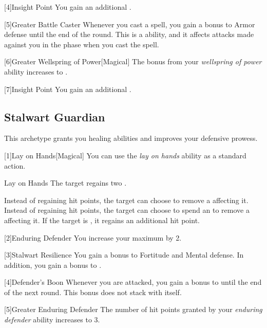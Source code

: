         [4]{Insight Point} You gain an additional .

        [5]{Greater Battle Caster} Whenever you cast a spell, you gain a  bonus to Armor defense until the end of the round.
        This is a  ability, and it affects attacks made against you in the phase when you cast the spell.

        [6]{Greater Wellspring of Power}[Magical]
        The bonus from your \textit{wellspring of power} ability increases to .

        [7]{Insight Point} You gain an additional .

    \subsection{Stalwart Guardian}
        This archetype grants you healing abilities and improves your defensive prowess.

        [1]{Lay on Hands}[Magical] You can use the \textit{lay on hands} ability as a standard action.
        \begin{freeability}{Lay on Hands}
            The target regains two .

            \rankline
             Instead of regaining hit points, the target can choose to remove a  affecting it.
             Instead of regaining hit points, the target can choose to spend an  to remove a  affecting it.
             If the target is , it regains an additional hit point.
        \end{freeability}

        [2]{Enduring Defender}
        You increase your maximum  by 2.

        [3]{Stalwart Resilience}
        You gain a  bonus to Fortitude and Mental defense.
        In addition, you gain a  bonus to .

        [4]{Defender's Boon}
        Whenever you are attacked, you gain a  bonus to  until the end of the next round.
        This bonus does not stack with itself.

        [5]{Greater Enduring Defender}
        The number of hit points granted by your \textit{enduring defender} ability increases to 3.

